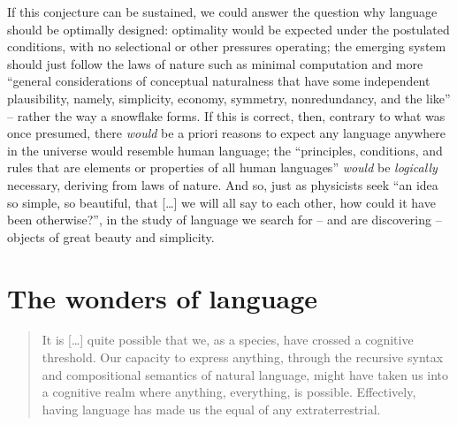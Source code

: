 \documentclass[output=paper]{langsci/langscibook}
\begin{document}
If this conjecture can be sustained, we could answer the question why language
should be optimally designed: optimality would be expected under the postulated
conditions, with no selectional or other pressures operating; the emerging
system should just follow the laws of nature such as minimal computation and
more “general considerations of conceptual naturalness that have some
independent plausibility, namely, simplicity, economy, symmetry, nonredundancy,
and the like” – rather the way a snowflake forms. If this is correct, then,
contrary to what was once presumed, there \emph{would} be a priori
reasons to expect any language anywhere in the universe would
resemble human language; the “principles, conditions, and rules that are
elements or properties of all human languages” \emph{would} be \emph{logically}
necessary, deriving from laws of nature. And so, just as physicists seek “an
idea so simple, so beautiful, that […] we will all say to each other, how could
it have been otherwise?”, in the study of language we search for – and are
discovering – objects of great beauty and simplicity.

\section{The wonders of language}

\begin{quote}
It is […] quite possible that we, as a species, have crossed a cognitive
thre\-shold. Our capacity to express anything, through the recursive syntax and
compositional semantics of natural language, might have taken us into a
cognitive realm where anything, everything, is possible. Effectively, having
language has made us the equal of any extraterrestrial.\\\hbox{}\hfill%
\hbox{\parencite[181--182]{Roberts2017}}
\end{quote}
\end{document}

